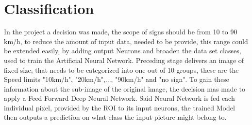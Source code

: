 \section{Classification}
In the project a decision was made, the scope of signs should be from 10 to 90 km/h, to reduce the amount of input data, needed to be provide, this range could be extended easily, by adding output Neurons and broaden the data set classes, used to train the Artificial Neural Network. \newline\newline
Preceding stage delivers an image of fixed size, that needs to be categorized into one out of 10 groups, these are the Speed limits "10km/h", "20km/h",..., "90km/h" and "no sign". To gain these information about the sub-image of the original image, the decision mas made to apply a Feed Forward Deep Neural Network. Said Neural Network is fed each individual pixel, provided by the ROI to its input neurons, the trained Model then outputs a prediction on what class the input picture might belong to.
\newline

